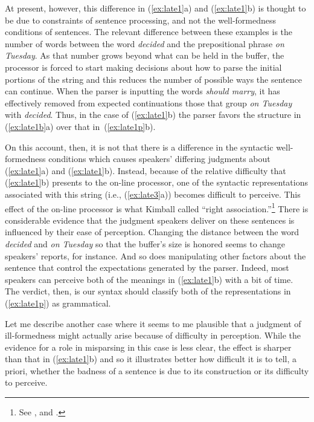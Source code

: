 {At present, however, this difference in (\ref{ex:late1}a) and (\ref{ex:late1}b) is thought to be due to constraints of sentence processing, and not the well-formedness conditions of sentences. The relevant difference between these examples is the number of words between the word \emph{decided} and the prepositional phrase \emph{on Tuesday}. As that number grows beyond what can be held in the buffer, the processor is forced to start making decisions about how to parse the initial portions of the string and this reduces the number of possible ways the sentence can continue. When the parser is inputting the words \emph{should marry}, it has effectively removed from expected continuations those that group \emph{on Tuesday} with \emph{decided}. Thus, in the case of (\ref{ex:late1}b) the parser favors the structure in (\ref{ex:late1b}a) over that in~(\ref{ex:late1p}b). 

On this account, then, it is not that there is a difference in the syntactic well-formedness conditions which causes speakers' differing judgments about (\ref{ex:late1}a) and (\ref{ex:late1}b). Instead, because of the relative difficulty that (\ref{ex:late1}b) presents to the on-line processor, one of the syntactic representations associated with this string (i.e., (\ref{ex:late3}a)) becomes difficult to perceive. This effect of the on-line processor is what Kimball called ``right association.''\footnote{See \citet{Kimball:1973}, \citet{Frazier:1978} and \citet{Gibson:1998a}.} There is considerable evidence that the judgment speakers deliver on these sentences is influenced by their ease of perception. Changing the distance between the word \emph{decided} and \emph{on Tuesday} so that the buffer's size is honored seems to change speakers' reports, for instance. And so does manipulating other factors about the sentence that control the expectations generated by the parser. Indeed, most speakers can perceive both of the meanings in (\ref{ex:late1}b) with a bit of time. The verdict, then, is our syntax should classify both of the representations in (\ref{ex:late1p}) as grammatical. 

Let me describe another case where it seems to me plausible that a judgment of ill-formedness might actually arise because of difficulty in perception. While the evidence for a role in misparsing in this case is less clear, the effect is sharper than that in (\ref{ex:late1}b) and so it illustrates better how difficult it is to tell, a priori, whether the badness of a sentence is due to its construction or its difficulty to perceive. 
\pagebreak

}
